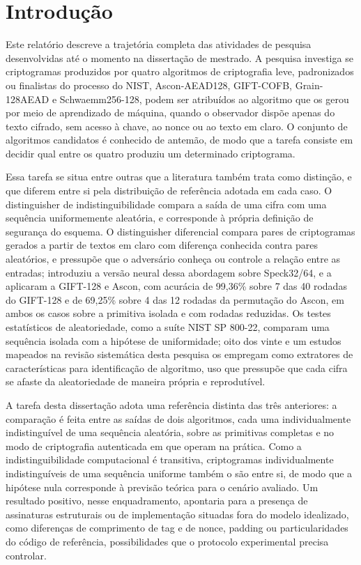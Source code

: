 %
%

\chapter{Introdu\c{c}\~{a}o}

Este relatório descreve a trajetória completa das atividades de pesquisa desenvolvidas até o momento na dissertação de mestrado. A pesquisa investiga se criptogramas produzidos por quatro algoritmos de criptografia leve, padronizados ou finalistas do processo do NIST, Ascon-AEAD128, GIFT-COFB, Grain-128AEAD e Schwaemm256-128, podem ser atribuídos ao algoritmo que os gerou por meio de aprendizado de máquina, quando o observador dispõe apenas do texto cifrado, sem acesso à chave, ao nonce ou ao texto em claro. O conjunto de algoritmos candidatos é conhecido de antemão, de modo que a tarefa consiste em decidir qual entre os quatro produziu um determinado criptograma.

Essa tarefa se situa entre outras que a literatura também trata como distinção, e que diferem entre si pela distribuição de referência adotada em cada caso. O distinguisher de indistinguibilidade compara a saída de uma cifra com uma sequência uniformemente aleatória, e corresponde à própria definição de segurança do esquema. O distinguisher diferencial compara pares de criptogramas gerados a partir de textos em claro com diferença conhecida contra pares aleatórios, e pressupõe que o adversário conheça ou controle a relação entre as entradas; \citet{gohr_2019} introduziu a versão neural dessa abordagem sobre Speck32/64, e \citet{shen_2024_giftascon} a aplicaram a GIFT-128 e Ascon, com acurácia de 99,36\% sobre 7 das 40 rodadas do GIFT-128 e de 69,25\% sobre 4 das 12 rodadas da permutação do Ascon, em ambos os casos sobre a primitiva isolada e com rodadas reduzidas. Os testes estatísticos de aleatoriedade, como a suíte NIST SP 800-22, comparam uma sequência isolada com a hipótese de uniformidade; oito dos vinte e um estudos mapeados na revisão sistemática desta pesquisa os empregam como extratores de características para identificação de algoritmo, uso que pressupõe que cada cifra se afaste da aleatoriedade de maneira própria e reprodutível.

A tarefa desta dissertação adota uma referência distinta das três anteriores: a comparação é feita entre as saídas de dois algoritmos, cada uma individualmente indistinguível de uma sequência aleatória, sobre as primitivas completas e no modo de criptografia autenticada em que operam na prática. Como a indistinguibilidade computacional é transitiva, criptogramas individualmente indistinguíveis de uma sequência uniforme também o são entre si, de modo que a hipótese nula corresponde à previsão teórica para o cenário avaliado. Um resultado positivo, nesse enquadramento, apontaria para a presença de assinaturas estruturais ou de implementação situadas fora do modelo idealizado, como diferenças de comprimento de tag e de nonce, padding ou particularidades do código de referência, possibilidades que o protocolo experimental precisa controlar.


